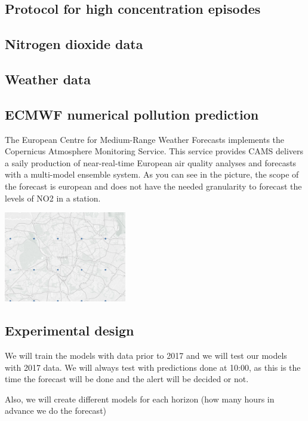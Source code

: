 \documentclass[a4paper,twocolumn,5p]{elsarticle}
\begin{document}
\subsection{Protocol for high \no concentration episodes}
\label{sec:madr-prot-high}


\subsection{Nitrogen dioxide data}
\label{sec:no2}


\subsection{Weather data}
\label{sec:weather-data}

\subsection{ECMWF numerical pollution prediction}
\label{sec:ecmwf-numer-poll}

The European Centre for Medium-Range Weather Forecasts implements the Copernicus Atmosphere Monitoring Service.
This service provides CAMS delivers a saily production of near-real-time European air quality analyses and forecasts 
with a multi-model ensemble system. 
As you can see in the picture, the scope of the forecast is european and does not have the needed granularity to forecast 
the levels of NO2 in a station.


\includegraphics[width=0.4\textwidth]{camspoints}

\subsection{Experimental design}
\label{sec:experimental-design}

We will train the models with data prior to 2017 and we will test our models with 2017 data. We will always test with 
predictions done at 10:00, as this is the time the forecast will be done and the alert will be decided or not.

Also, we will create different models for each horizon (how many hours in advance we do the forecast)
\end{document}
